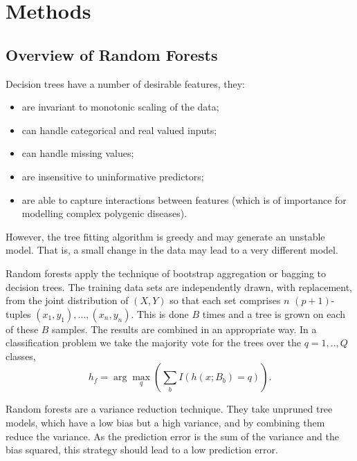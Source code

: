 \documentclass[10pt,letterpaper]{article}
\begin{document}
\section{Methods}
\label{section:methods}

\subsection{Overview of Random Forests}

Decision trees have a number of desirable features, they:
\begin{itemize}
  \item are invariant to monotonic scaling of the data;
  \item can handle categorical and real valued inputs;
  \item can handle missing values;
  \item are insensitive to uninformative predictors;
  \item are able to capture interactions between features (which is of importance for modelling complex polygenic diseases).
  \end{itemize}
However, the tree fitting algorithm is greedy and may generate an unstable model. That is, a small change in the data may
lead to a very different model. 

Random forests  apply the technique of bootstrap aggregation or bagging to decision trees.  The training
data sets are independently drawn, with replacement,  from the joint distribution of $(X,Y)$ so that each set comprises $n$ $(p+1)$-tuples
 $(x_1,y_1),\ldots, (x_n,y_n)$. This is done $B$ times and  a tree is grown on each of these $B$ samples.
The results are combined in an appropriate way. In a classification problem we take the majority vote for the trees over
the $q=1,..,Q$ classes,
\begin{equation*}
{{h_f}}= \arg \max_q \left(\sum_b I(h(x;B_b)=q)\right).
\end{equation*}

Random forests are a variance reduction technique. They take unpruned tree models, which have a low bias but a high
variance, and by combining them reduce the variance. As the prediction error is the sum of the variance and the bias
squared, this strategy should lead to a low prediction error.
\end{document}
